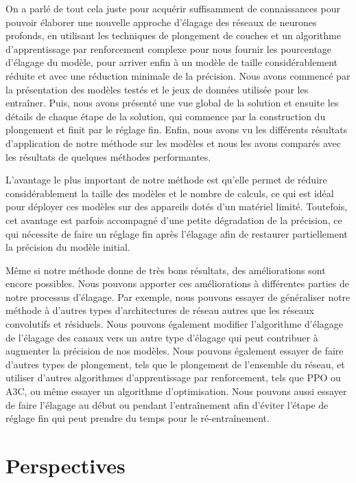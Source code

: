 On a parlé de tout cela juste pour acquérir suffisamment de connaissances pour pouvoir élaborer une nouvelle approche d'élagage des réseaux de neurones profonds, en utilisant les techniques de plongement de couches et un algorithme d'apprentissage par renforcement complexe pour nous fournir les pourcentage d'élagage du modèle, pour arriver enfin à un modèle de taille considérablement réduite et avec une réduction minimale de la précision. Nous avons commencé par la présentation des modèles testés et le jeux de données utilisée pour les entraîner. Puis, nous avons présenté une vue global de la solution et ensuite les détails de chaque étape de la solution, qui commence par la construction du plongement et finit par le réglage fin. Enfin, nous avons vu les différents résultats d'application de notre méthode sur les modèles et nous les avons comparés avec les résultats de quelques méthodes performantes.

L'avantage le plus important de notre méthode est qu'elle permet de réduire considérablement la taille des modèles et le nombre de calculs, ce qui est idéal pour déployer ces modèles sur des appareils dotés d'un matériel limité. Toutefois, cet avantage est parfois accompagné d'une petite dégradation de la précision, ce qui nécessite de faire un réglage fin après l'élagage afin de restaurer partiellement la précision du modèle initial.

Même si notre méthode donne de très bons résultats, des améliorations sont encore possibles. Nous pouvons apporter ces améliorations à différentes parties de notre processus d’élagage. Par exemple, nous pouvons essayer de généraliser notre méthode à d'autres types d’architectures de réseau autres que les réseaux convolutifs et résiduels. Nous pouvons également modifier l'algorithme d'élagage de l'élagage des canaux vers un autre type d'élagage qui peut contribuer à augmenter la précision de nos modèles. Nous pouvons également essayer de faire d'autres types de plongement, tels que le plongement de l'ensemble du réseau, et utiliser d'autres algorithmes d'apprentissage par renforcement, tels que PPO ou A3C, ou même essayer un algorithme d'optimisation. Nous pouvons aussi essayer de faire l'élagage au début ou pendant l'entraînement afin d'éviter l'étape de réglage fin qui peut prendre du temps pour le ré-entraînement.
    
    

\section*{Perspectives}


